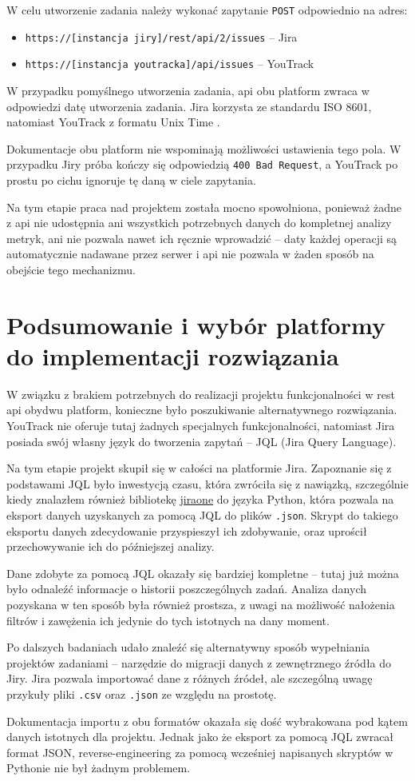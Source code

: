 W celu utworzenie zadania należy wykonać zapytanie \texttt{POST} odpowiednio na adres:
\begin{itemize}
    \item \texttt{https://[instancja jiry]/rest/api/2/issues} -- Jira
    \item \texttt{https://[instancja youtracka]/api/issues} -- YouTrack
\end{itemize}
W przypadku pomyślnego utworzenia zadania, api obu platform zwraca w odpowiedzi datę utworzenia zadania. Jira korzysta ze standardu ISO 8601, natomiast YouTrack z formatu Unix Time \cite{UnixProgrammersManual}.

Dokumentacje obu platform nie wspominają możliwości ustawienia tego pola. W przypadku Jiry próba kończy się odpowiedzią \texttt{400 Bad Request}, a YouTrack po prostu po cichu ignoruje tę daną
w ciele zapytania.

Na tym etapie praca nad projektem została mocno spowolniona, ponieważ żadne z api nie udostępnia ani wszystkich potrzebnych danych do kompletnej analizy metryk, ani nie pozwala nawet ich ręcznie wprowadzić -- daty każdej operacji
są automatycznie nadawane przez serwer i api nie pozwala w żaden sposób na obejście tego mechanizmu.

\section{Podsumowanie i wybór platformy do implementacji rozwiązania}
W związku z brakiem potrzebnych do realizacji projektu funkcjonalności w rest api obydwu platform, konieczne było poszukiwanie alternatywnego rozwiązania.
YouTrack nie oferuje tutaj żadnych specjalnych funkcjonalności, natomiast Jira posiada swój własny język do tworzenia zapytań -- JQL (Jira Query Language). \cite{YouTrackSearch} \cite{JiraJQL}

Na tym etapie projekt skupił się w całości na platformie Jira. Zapoznanie się z podstawami JQL było inwestycją czasu, która zwróciła się z nawiązką, szczególnie kiedy znalazłem również bibliotekę \href{https://pypi.org/project/jiraone/}{jiraone} do języka Python,
która pozwala na eksport danych uzyskanych za pomocą JQL do plików \texttt{.json}. Skrypt do takiego eksportu danych zdecydowanie przyspieszył ich zdobywanie, oraz uprościł przechowywanie ich do późniejszej analizy.

Dane zdobyte za pomocą JQL okazały się bardziej kompletne -- tutaj już można było odnaleźć informacje o historii poszczególnych zadań. Analiza danych pozyskana w ten sposób była również prostsza, z uwagi na możliwość nałożenia filtrów i zawężenia ich
jedynie do tych istotnych na dany moment.

Po dalszych badaniach udało znaleźć się alternatywny sposób wypełniania projektów zadaniami -- narzędzie do migracji danych z zewnętrznego źródła do Jiry. \cite{JiraImportExport}
Jira pozwala importować dane z różnych źródeł, ale szczególną uwagę przykuły pliki \texttt{.csv} oraz \texttt{.json} ze względu na prostotę.

Dokumentacja importu z obu formatów okazała się dość wybrakowana pod kątem danych istotnych dla projektu. Jednak jako że eksport za pomocą JQL zwracał format JSON, reverse-engineering za pomocą wcześniej napisanych skryptów w Pythonie nie był
żadnym problemem.
